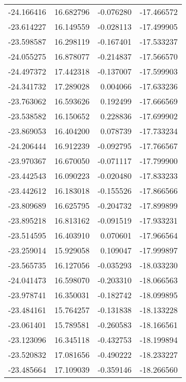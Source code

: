 \begin{tabular}{rrrr}
      -24.166416 &        16.682796 &   -0.076280 & -17.466572 \\
      -23.614227 &        16.149559 &   -0.028113 & -17.499905 \\
      -23.598587 &        16.298119 &   -0.167401 & -17.533237 \\
      -24.055275 &        16.878077 &   -0.214837 & -17.566570 \\
      -24.497372 &        17.442318 &   -0.137007 & -17.599903 \\
      -24.341732 &        17.289028 &    0.004066 & -17.633236 \\
      -23.763062 &        16.593626 &    0.192499 & -17.666569 \\
      -23.538582 &        16.150652 &    0.228836 & -17.699902 \\
      -23.869053 &        16.404200 &    0.078739 & -17.733234 \\
      -24.206444 &        16.912239 &   -0.092795 & -17.766567 \\
      -23.970367 &        16.670050 &   -0.071117 & -17.799900 \\
      -23.442543 &        16.090223 &   -0.020480 & -17.833233 \\
      -23.442612 &        16.183018 &   -0.155526 & -17.866566 \\
      -23.809689 &        16.625795 &   -0.204732 & -17.899899 \\
      -23.895218 &        16.813162 &   -0.091519 & -17.933231 \\
      -23.514595 &        16.403910 &    0.070601 & -17.966564 \\
      -23.259014 &        15.929058 &    0.109047 & -17.999897 \\
      -23.565735 &        16.127056 &   -0.035293 & -18.033230 \\
      -24.041473 &        16.598070 &   -0.203310 & -18.066563 \\
      -23.978741 &        16.350031 &   -0.182742 & -18.099895 \\
      -23.484161 &        15.764257 &   -0.131838 & -18.133228 \\
      -23.061401 &        15.789581 &   -0.260583 & -18.166561 \\
      -23.123096 &        16.345118 &   -0.432753 & -18.199894 \\
      -23.520832 &        17.081656 &   -0.490222 & -18.233227 \\
      -23.485664 &        17.109039 &   -0.359146 & -18.266560 \\

\end{tabular}

